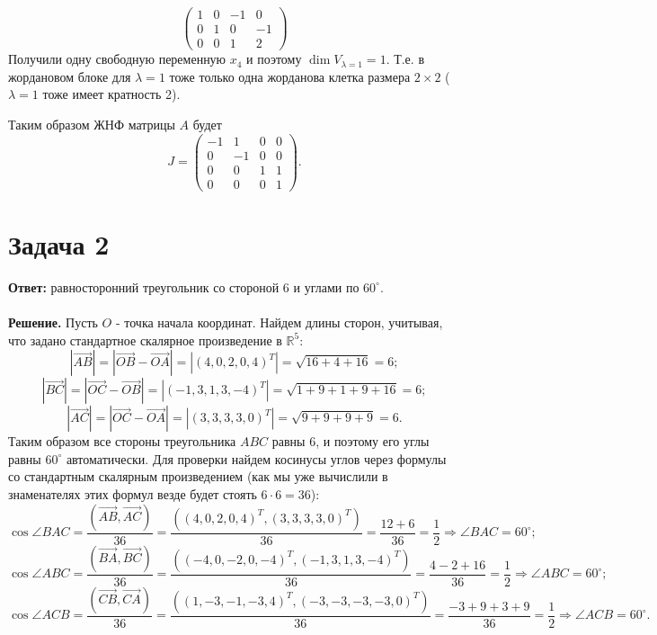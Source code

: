 \documentclass{article}
\begin{document}
$$\left(\begin{array}{rrrr}1 & 0 & -1 & 0\\0 & 1 & 0 & -1\\0 & 0 & 1 & 2\end{array}\right)$$
Получили одну свободную переменную $x_4$ и поэтому $\dim V_{\lambda=1}=1$. Т.е. в жордановом блоке для $\lambda=1$ тоже только одна жорданова клетка размера $2\times2$ ($\lambda=1$ тоже имеет кратность 2).
\par
Таким образом ЖНФ матрицы $A$ будет
$$J=\left(\begin{array}{rrrr}-1 & 1 & 0 & 0\\0 & -1 & 0 & 0\\0 & 0 & 1 & 1\\0 & 0 & 0 & 1\end{array}\right).$$

\section*{Задача 2}
{\bf Ответ:} равносторонний треугольник со стороной 6 и углами по $60^{\circ}$.
\\
\\
{\bf Решение.} Пусть $O$ - точка начала координат. Найдем длины сторон, учитывая, что задано стандартное скалярное произведение в $\mathbb{R}^5$:
$$|\overrightarrow{AB}|=|\overrightarrow{OB}-\overrightarrow{OA}|=|(4,0,2,0,4)^T|=\sqrt{16+4+16}=6;$$
$$|\overrightarrow{BC}|=|\overrightarrow{OC}-\overrightarrow{OB}|=|(-1,3,1,3,-4)^T|=\sqrt{1+9+1+9+16}=6;$$
$$|\overrightarrow{AC}|=|\overrightarrow{OC}-\overrightarrow{OA}|=|(3,3,3,3,0)^T|=\sqrt{9+9+9+9}=6.$$
Таким образом все стороны треугольника $ABC$ равны 6, и поэтому его углы равны $60^{\circ}$ автоматически. Для проверки найдем косинусы углов через формулы со стандартным скалярным произведением (как мы уже вычислили в знаменателях этих формул везде будет стоять $6\cdot6=36$):
$$\cos \angle{BAC}=\frac{(\overrightarrow{AB},\overrightarrow{AC})}{36}=\frac{((4,0,2,0,4)^T, (3,3,3,3,0)^T)}{36}=\frac{12+6}{36}=\frac{1}{2}\Rightarrow \angle{BAC}=60^{\circ};$$
$$\cos \angle{ABC}=\frac{(\overrightarrow{BA},\overrightarrow{BC})}{36}=\frac{((-4,0,-2,0,-4)^T, (-1,3,1,3,-4)^T)}{36}=\frac{4-2+16}{36}=\frac{1}{2}\Rightarrow \angle{ABC}=60^{\circ};$$
$$\cos \angle{ACB}=\frac{(\overrightarrow{CB},\overrightarrow{CA})}{36}=\frac{((1,-3,-1,-3,4)^T, (-3,-3,-3,-3,0)^T)}{36}=\frac{-3+9+3+9}{36}=\frac{1}{2}\Rightarrow \angle{ACB}=60^{\circ}.$$
\end{document}
